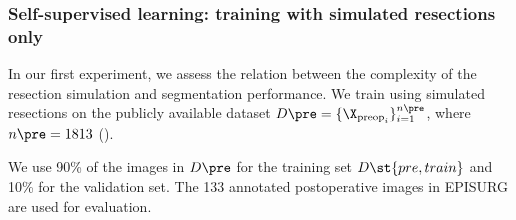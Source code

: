 \subsubsection{Self-supervised learning: training with simulated resections only}
\label{sec:self}



In our first experiment, we assess the relation between the complexity of the resection simulation and segmentation performance.
We train using simulated resections on the publicly available dataset
$D\pre = \{ \X_{\text{preop}_i} \}_{i = 1}^{n\pre}$, where $n\pre = 1813$ ().

We use 90\% of the images in $D\pre$ for the training set $D\st{pre,train}$ and 10\% for the validation set.
The 133 annotated postoperative images in EPISURG are used for evaluation.

